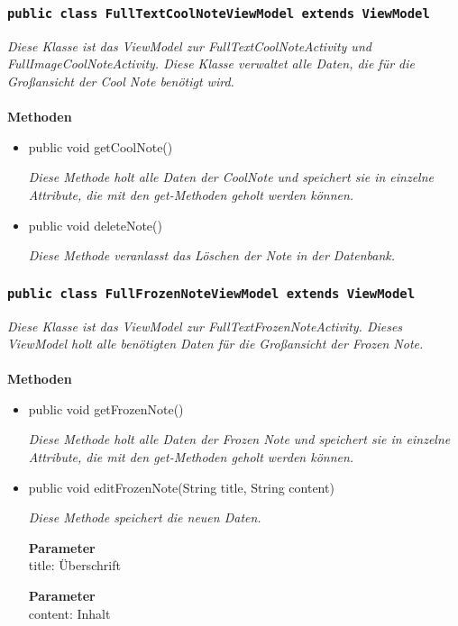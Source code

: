            		\subsubsection{\texttt{public class FullTextCoolNoteViewModel extends ViewModel}}
        \textit{Diese Klasse ist das ViewModel zur FullTextCoolNoteActivity und FullImageCoolNoteActivity. Diese Klasse verwaltet alle Daten, die für die Großansicht der Cool Note benötigt wird.}\\
        \\
		\textbf{Methoden} \\
 			\begin{itemize}
        		\item{public void getCoolNote()}
        	
        		\textit{Diese Methode holt alle Daten der CoolNote und speichert sie in einzelne Attribute, die mit den get-Methoden geholt werden können.}
        		
        		\item{public void deleteNote()}
        	
        		\textit{Diese Methode veranlasst das Löschen der Note in der Datenbank.}

       		 \end{itemize}
             
             
                 \subsubsection{\texttt{public class FullFrozenNoteViewModel extends ViewModel}}
        \textit{Diese Klasse ist das ViewModel zur FullTextFrozenNoteActivity. Dieses ViewModel holt alle benötigten Daten für die Großansicht der Frozen Note.}\\
        \\
		\textbf{Methoden} \\
 			\begin{itemize}
        		\item{public void getFrozenNote()}
        	
        		\textit{Diese Methode holt alle Daten der Frozen Note und speichert sie in einzelne Attribute, die mit den get-Methoden geholt werden können.}
        	
        		\item{public void editFrozenNote(String title, String content)}
        	
        		\textit{Diese Methode speichert die neuen Daten.}
        	
        	\textbf{Parameter} \\
				title: Überschrift
				
			\textbf{Parameter} \\
			content: Inhalt
				
       		 \end{itemize}
       		 
